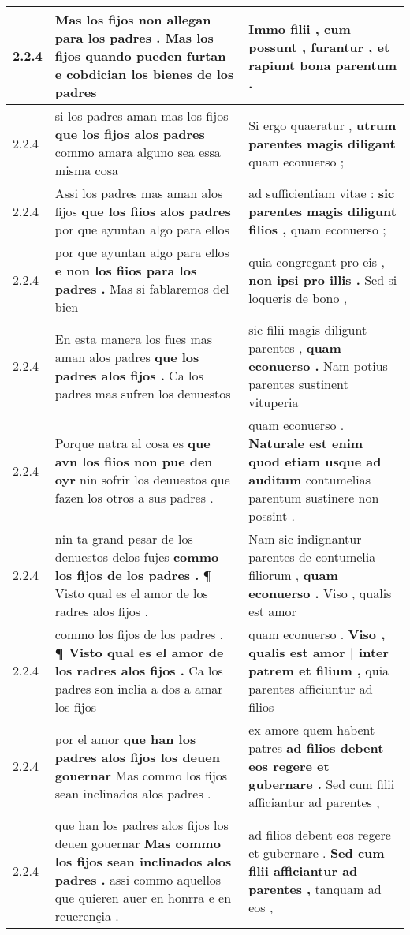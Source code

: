 \begin{tabular}{|p{1cm}|p{6.5cm}|p{6.5cm}|}
2.2.4 & Mas los fijos non allegan para los padres . \textbf{ Mas los fijos quando pueden furtan } e cobdician los bienes de los padres & Immo filii , \textbf{ cum possunt , furantur , } et rapiunt bona parentum . \\\hline
2.2.4 & si los padres aman mas los fijos \textbf{ que los fijos alos padres } commo amara alguno sea essa misma cosa & Si ergo quaeratur , \textbf{ utrum parentes magis diligant } quam econuerso ; \\\hline
2.2.4 & Assi los padres mas aman alos fijos \textbf{ que los fiios alos padres } por que ayuntan algo para ellos & ad sufficientiam vitae : \textbf{ sic parentes magis diligunt filios , } quam econuerso ; \\\hline
2.2.4 & por que ayuntan algo para ellos \textbf{ e non los fiios para los padres . } Mas si fablaremos del bien & quia congregant pro eis , \textbf{ non ipsi pro illis . } Sed si loqueris de bono , \\\hline
2.2.4 & En esta manera los fues mas aman alos padres \textbf{ que los padres alos fijos . } Ca los padres mas sufren los denuestos & sic filii magis diligunt parentes , \textbf{ quam econuerso . } Nam potius parentes sustinent vituperia \\\hline
2.2.4 & Porque natra al cosa es \textbf{ que avn los fiios non pue den oyr } nin sofrir los deuuestos que fazen los otros a sus padres . & quam econuerso . \textbf{ Naturale est enim quod etiam usque ad auditum } contumelias parentum sustinere non possint . \\\hline
2.2.4 & nin ta grand pesar de los denuestos delos fujes \textbf{ commo los fijos de los padres . } ¶ Visto qual es el amor de los radres alos fijos . & Nam sic indignantur parentes de contumelia filiorum , \textbf{ quam econuerso . } Viso , qualis est amor \\\hline
2.2.4 & commo los fijos de los padres . \textbf{ ¶ Visto qual es el amor de los radres alos fijos . } Ca los padres son inclia a dos a amar los fijos & quam econuerso . \textbf{ Viso , qualis est amor | inter patrem et filium , } quia parentes afficiuntur ad filios \\\hline
2.2.4 & por el amor \textbf{ que han los padres alos fijos los deuen gouernar } Mas commo los fijos sean inclinados alos padres . & ex amore quem habent patres \textbf{ ad filios debent eos regere et gubernare . } Sed cum filii afficiantur ad parentes , \\\hline
2.2.4 & que han los padres alos fijos los deuen gouernar \textbf{ Mas commo los fijos sean inclinados alos padres . } assi commo aquellos que quieren auer en honrra e en reuerençia . & ad filios debent eos regere et gubernare . \textbf{ Sed cum filii afficiantur ad parentes , } tanquam ad eos , \\\hline

\end{tabular}
